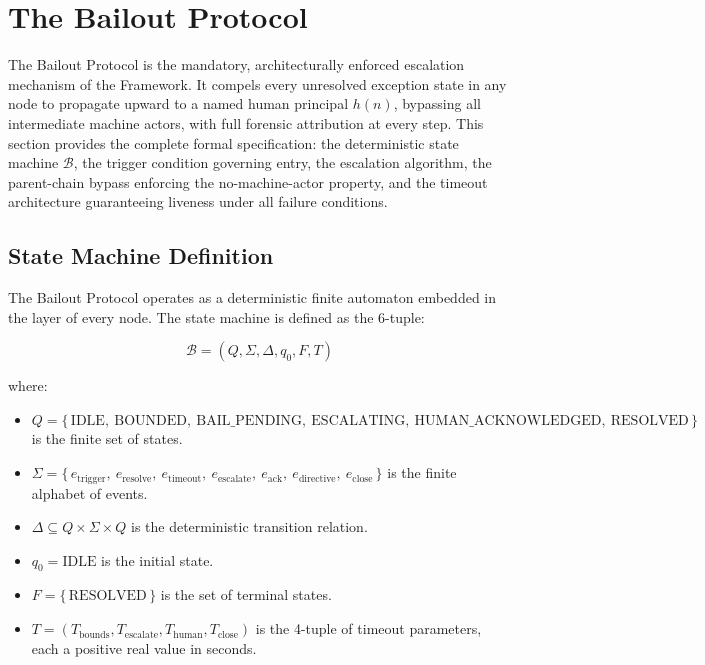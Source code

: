 \section{The Bailout Protocol}\label{sec:bailout}

The Bailout Protocol is the mandatory, architecturally enforced escalation mechanism of the \bxthree{} Framework. It compels every unresolved exception state in any \bxthree{} node to propagate upward to a named human principal $h(n)$, bypassing all intermediate machine actors, with full forensic attribution at every step. This section provides the complete formal specification: the deterministic state machine $\mathcal{B}$, the trigger condition governing entry, the escalation algorithm, the parent-chain bypass enforcing the no-machine-actor property, and the timeout architecture guaranteeing liveness under all failure conditions.

\subsection{State Machine Definition}\label{sec:state-machine}

The Bailout Protocol operates as a deterministic finite automaton embedded in the \fact{} layer of every \bxthree{} node. The state machine is defined as the 6-tuple:

\begin{equation}
\mathcal{B} = (Q, \Sigma, \Delta, q_0, F, T)
\end{equation}

where:

\begin{itemize}\itemsep=0pt
\item $Q = \{\,\text{IDLE},\ \text{BOUNDED},\ \text{BAIL\_PENDING},\ \text{ESCALATING},\ \text{HUMAN\_ACKNOWLEDGED},\ \text{RESOLVED}\,\}$ is the finite set of states.
\item $\Sigma = \{\,e_{\text{trigger}},\ e_{\text{resolve}},\ e_{\text{timeout}},\ e_{\text{escalate}},\ e_{\text{ack}},\ e_{\text{directive}},\ e_{\text{close}}\,\}$ is the finite alphabet of events.
\item $\Delta \subseteq Q \times \Sigma \times Q$ is the deterministic transition relation.
\item $q_0 = \text{IDLE}$ is the initial state.
\item $F = \{\,\text{RESOLVED}\,\}$ is the set of terminal states.
\item $T = (T_{\text{bounds}}, T_{\text{escalate}}, T_{\text{human}}, T_{\text{close}})$ is the 4-tuple of timeout parameters, each a positive real value in seconds.
\end{itemize}

